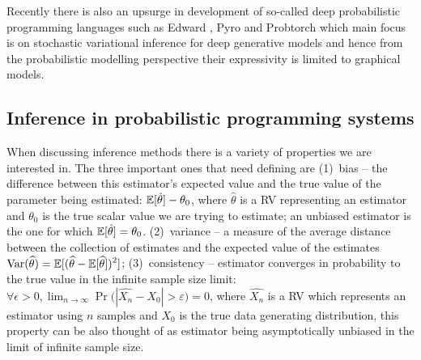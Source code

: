 \documentclass[12pt]{article}
\begin{document}
Recently there is also an upsurge in development of so-called deep probabilistic programming languages such as Edward \citep{TranEtAl2016}, Pyro \citep{Pyro2018} and Probtorch \citep{Siddharth2017} which main focus is on stochastic variational inference for deep generative models and hence from the probabilistic modelling perspective their expressivity is limited to graphical models.





\subsection{Inference in probabilistic programming systems}
\label{sec:inference-prob-prog}


When discussing inference methods there is a variety of properties we are interested in.
The three important ones that need defining are 
(1)~bias -- the difference between this estimator's expected value and the true value of the parameter being estimated: 
$\mathbb{E} [\hat{\theta}] - \theta_0$, 
where $\hat{\theta}$ is a RV representing an estimator and $\theta_0$ is the true scalar value we are trying to estimate; 
an unbiased estimator is the one for which $\mathbb{E} [\hat{\theta}] = \theta_0$.
(2)~variance -- a measure of the average distance between the collection of estimates and the expected value of the estimates
${\displaystyle \operatorname {Var} ({\widehat {\theta }})=\mathbb{E} [({\widehat {\theta }}-\mathbb{E} [{\widehat {\theta }}])^{2}]}$;
(3)~consistency -- estimator converges in probability to the true value in the infinite sample size limit: 
$\forall \epsilon>0, \lim _{n\to \infty}\Pr {\big (}|\hat{X_{n}}-X_0| > \varepsilon {\big )}=0$, 
where $\hat{X_n}$ is a RV which represents an estimator using $n$ samples and $X_0$ is the true data generating distribution,
this property can be also thought of as estimator being asymptotically unbiased in the limit of infinite sample size.
\end{document}
